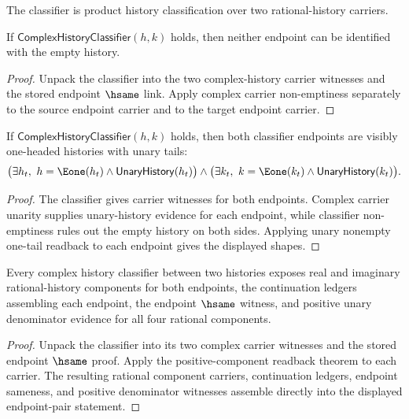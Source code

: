 \begin{definition}
\label{def:complex-classifier-specification}
The classifier is product history classification over two rational-history
carriers.
\end{definition}

\begin{theorem}
\label{thm:complex-history-classifier-nonempty-endpoints}
If $\mathsf{ComplexHistoryClassifier}(h,k)$ holds, then neither endpoint can
be identified with the empty history.
\end{theorem}
\begin{proof}
Unpack the classifier into the two complex-history carrier witnesses and the
stored endpoint $\hsame$ link. Apply complex carrier non-emptiness separately
to the source endpoint carrier and to the target endpoint carrier.
\end{proof}

\begin{theorem}
\label{thm:complex-history-classifier-endpoint-e1-shapes}
If $\mathsf{ComplexHistoryClassifier}(h,k)$ holds, then both classifier
endpoints are visibly one-headed histories with unary tails:
$$
\bigl(\exists h_t,\ h=\Eone(h_t)\land\mathsf{UnaryHistory}(h_t)\bigr)
\land
\bigl(\exists k_t,\ k=\Eone(k_t)\land\mathsf{UnaryHistory}(k_t)\bigr).
$$
\end{theorem}
\begin{proof}
The classifier gives carrier witnesses for both endpoints. Complex carrier
unarity supplies unary-history evidence for each endpoint, while classifier
non-emptiness rules out the empty history on both sides. Applying unary
nonempty one-tail readback to each endpoint gives the displayed shapes.
\end{proof}

\begin{theorem}
\label{thm:complex-history-classifier-positive-components}
Every complex history classifier between two histories exposes real and
imaginary rational-history components for both endpoints, the continuation
ledgers assembling each endpoint, the endpoint $\hsame$ witness, and positive
unary denominator evidence for all four rational components.
\end{theorem}
\begin{proof}
Unpack the classifier into its two complex carrier witnesses and the stored
endpoint $\hsame$ proof. Apply the positive-component readback theorem to
each carrier. The resulting rational component carriers, continuation
ledgers, endpoint sameness, and positive denominator witnesses assemble
directly into the displayed endpoint-pair statement.
\end{proof}

